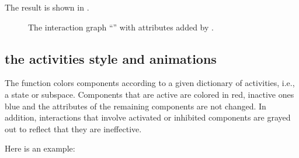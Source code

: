 \documentclass[letterpaper,10pt,english]{sphinxmanual}
\begin{document}
The result is shown in {\hyperref[\detokenize{Manual:figure07}]{}}.

\begin{figure}[htbp]
\centering
\capstart

\noindent{}
\caption{The interaction graph “” with attributes added by {\hyperref[\detokenize{InteractionGraphs:add-style-subgraphs}]{}}.}\label{\detokenize{Manual:figure07}}\label{\detokenize{Manual:id11}}\end{figure}


\subsection{the activities style and animations}
\label{\detokenize{Manual:the-activities-style-and-animations}}
The function {\hyperref[\detokenize{InteractionGraphs:add-style-activities}]{}} colors components according to a given dictionary of activities, i.e., a state or subspace.
Components that are active are colored in red, inactive ones blue and the attributes of the remaining components are not changed.
In addition, interactions that involve activated or inhibited components are grayed out to reflect that they are ineffective.

Here is an example:
\end{document}
